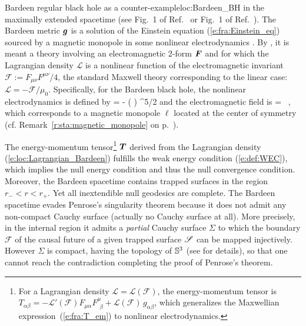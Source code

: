 \begin{texample}{Bardeen regular black hole as a counter-example}{loc:Bardeen_BH}
in the maximally extended spacetime (see Fig.~1 of Ref.~\cite{Ansol08} or Fig.~1 of Ref.~\cite{Maeda22}).
The Bardeen metric $\bm{g}$ is a solution of the Einstein equation
(\ref{e:fra:Einstein_eq}) sourced by a magnetic monopole in some nonlinear
electrodynamics \cite{AyonG00}. By ,
it is meant a theory involving an electromagnetic 2-form $\bm{F}$ and for which
the Lagrangian density $\mathcal{L}$ is
a nonlinear function of the electromagnetic invariant $\mathcal{F} := F_{\mu\nu} F^{\mu\nu} / 4$,
the standard Maxwell theory corresponding to the linear case: $\mathcal{L} = - \mathcal{F}/\mu_0$.
Specifically, for the Bardeen black hole, the nonlinear electrodynamics is defined by \cite{AyonG00}
\be \label{e:loc:Lagrangian_Bardeen}
     = -  \left(
     \right) ^{5/2}
\ee
and the electromagnetic field is
\be
     =  \ell \sin\th \, \dd\th \wedge \dd\ph,
\ee
which corresponds to a magnetic monopole $\ell$ located at the center of symmetry
(cf. Remark~\ref{r:sta:magnetic_monopole} on p.~\pageref{r:sta:magnetic_monopole}).

The energy-momentum tensor\footnote{For a Lagrangian density $\mathcal{L} = \mathcal{L}(\mathcal{F})$,
the energy-momentum tensor is
$T_{\alpha\beta} = - \mathcal{L}'(\mathcal{F}) F_{\mu\alpha} F^\mu_{\ \, \beta}
        + \mathcal{L}(\mathcal{F}) \, g_{\alpha\beta}$,
which generalizes the Maxwellian expression~(\ref{e:fra:T_em}) to nonlinear electrodynamics.}
$\bm{T}$ derived from the Lagrangian density (\ref{e:loc:Lagrangian_Bardeen})
fulfills the weak energy condition (\ref{e:def:WEC}), which implies the null energy condition and
thus the null convergence condition.
Moreover, the Bardeen spacetime contains trapped surfaces in the region $r_- < r < r_+$. Yet all inextendible null geodesics are complete. The Bardeen spacetime evades Penrose's singularity theorem
because it does not admit any non-compact Cauchy surface (actually no Cauchy surface at all). More precisely, in the internal region
it admits a \emph{partial} Cauchy surface $\Sigma$ to which the boundary $\mathscr{F}$
of the causal future of a given trapped surface $\mathscr{S}$ can be mapped injectively.
However $\Sigma$ is compact,
having the topology of $\mathbb{S}^3$ (see \cite{Borde97} for details), so that one cannot reach
the contradiction completing the proof of Penrose's theorem.
\end{texample}


